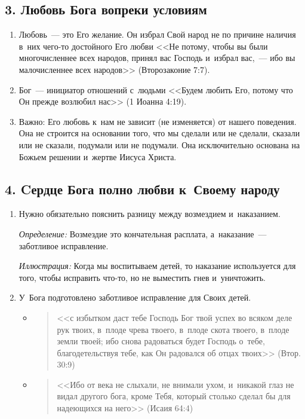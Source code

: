 \documentclass[a4paper,12pt]{article}
\begin{document}
\subsection{3. Любовь Бога вопреки условиям}
\begin{enumerate}
    \item Любовь~--- это Его желание. Он избрал Свой народ не по причине наличия в~них чего-то достойного Его любви  <<Не потому, чтобы вы были многочисленнее всех народов, принял вас Господь и~избрал вас,~--- ибо вы малочисленнее всех народов>> (Второзаконие 7:7).
    \item  Бог~--- инициатор отношений с~людьми <<Будем любить Его, потому что Он прежде возлюбил нас>> (1 Иоанна 4:19). 
    \item  Важно: Его любовь к~нам не зависит (не изменяется) от нашего поведения. Она не строится на основании того, что мы сделали или не сделали, сказали или не сказали, подумали или не подумали. Она исключительно основана на Божьем решении и~жертве Иисуса Христа.
\end{enumerate}

\subsection{4. Cердце Бога полно любви к~Своему народу}
\begin{enumerate}
    \item Нужно обязательно пояснить разницу между возмездием и~наказанием. 
    
    \emph{Определение:} Возмездие это кончательная расплата, а~наказание~--- заботливое исправление.

    \emph{Иллюстрация:} Когда мы воспитываем детей, то наказание используется для того, чтобы исправить что-то, но не выместить гнев и~уничтожить.

    \item У~Бога подготовлено заботливое исправление для Своих детей. 
    \begin{itemize}
        \item 
        \begin{quote}
        <<с избытком даст тебе Господь Бог твой успех во всяком деле рук твоих, в~плоде чрева твоего, в~плоде скота твоего, в~плоде земли твоей; ибо снова радоваться будет Господь о~тебе, благодетельствуя тебе, как Он радовался об отцах твоих>> (Втор. 30:9) 
        \end{quote}
        \item 
        \begin{quote}
        <<Ибо от века не слыхали, не внимали ухом, и~никакой глаз не видал другого бога, кроме Тебя, который столько сделал бы для надеющихся на него>> (Исаия 64:4)
        \end{quote}
    \end{itemize}
\end{enumerate}
\end{document}
